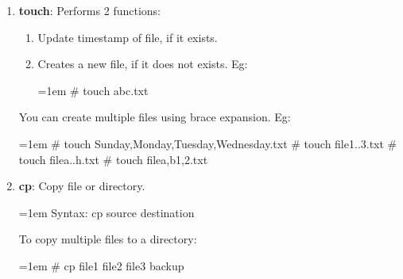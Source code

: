 \begin{flushleft}
\begin{enumerate}
		\bigskip
		\bigskip
		\item \textbf{touch}: Performs 2 functions:
		\begin{enumerate}[label=(\alph*)]
		\item Update timestamp of file, if it exists.
		\item Creates a new file, if it does not exists.
		\newline
		Eg:
		\begin{tcolorbox}[breakable,notitle,boxrule=-0pt,colback=black,colframe=black]
			\color{green}
			\font=1em
			\# touch abc.txt
			\font=4pt
		\end{tcolorbox}
		\end{enumerate}
		
		You can create multiple files using brace expansion.
		\newline
		Eg:
		\begin{tcolorbox}[breakable,notitle,boxrule=-0pt,colback=black,colframe=black]
			\color{green}
			\font=1em
			\# touch {Sunday,Monday,Tuesday,Wednesday}.txt
			\newline
			\# touch file{1..3}.txt
			\newline
			\# touch file{a..h}.txt
			\newline
			\# touch file{a,b}{1,2}.txt
			\font=4pt
		\end{tcolorbox}
		
		\bigskip
		\bigskip
		\item \textbf{cp}: Copy file or directory.
		\bigskip
		\begin{tcolorbox}[breakable,notitle,boxrule=1pt,colback=pink,colframe=pink]
			\color{black}
			\font=1em
			Syntax: cp source destination
			\font=4pt
		\end{tcolorbox}
		To copy multiple files to a directory:
			\bigskip
			\begin{tcolorbox}[breakable,notitle,boxrule=-0pt,colback=black,colframe=black]
				\color{green}
				\font=1em
				\# cp file1 file2 file3 backup
				\font=4pt
			\end{tcolorbox}


\end{enumerate}
\end{flushleft}
